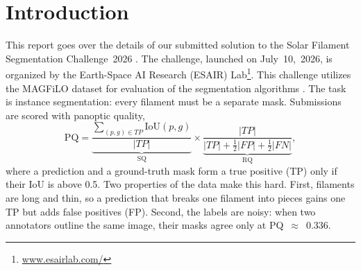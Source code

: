 \documentclass[sigconf]{acmart}
\begin{document}


\section{Introduction}
    This report goes over the details of our submitted solution to the Solar Filament Segmentation Challenge~2026 \cite{filament-segmentation-2026}. The challenge, launched on July~10,~2026, is organized by the Earth-Space AI Research (ESAIR) Lab\footnote{\href{https://www.esairlab.com/home}{www.esairlab.com/}}. This challenge utilizes the MAGFiLO dataset for evaluation of the segmentation algorithms \cite{ahmadzadeh2024dataset}. The task is instance segmentation: every filament must be a separate
mask. Submissions are scored with panoptic quality,
\begin{equation}
  \mathrm{PQ}=\underbrace{\frac{\sum_{(p,g)\in TP}\mathrm{IoU}(p,g)}{|TP|}}_{\mathrm{SQ}}
  \times\underbrace{\frac{|TP|}{|TP|+\frac12|FP|+\frac12|FN|}}_{\mathrm{RQ}},
\end{equation}
where a prediction and a ground-truth mask form a true positive (TP)
only if their IoU is above 0.5. Two properties of the data make this hard.
First, filaments are long and thin, so a prediction that breaks one
filament into pieces gains one TP but adds false positives (FP). Second,
the labels are noisy: when two annotators outline the same image, their
masks agree only at PQ~$\approx$~0.336.
\end{document}
